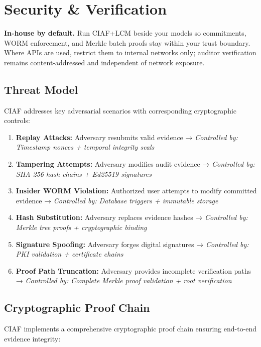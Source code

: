 \documentclass[12pt,a4paper]{article}
\begin{document}
\section{Security \& Verification}

\begin{technicalbox}
\textbf{In-house by default.} Run CIAF+LCM beside your models so commitments, WORM enforcement, and Merkle batch proofs stay within your trust boundary. Where APIs are used, restrict them to internal networks only; auditor verification remains content-addressed and independent of network exposure.
\end{technicalbox}

\subsection{Threat Model}

CIAF addresses key adversarial scenarios with corresponding cryptographic controls:

\begin{enumerate}
\item \textbf{Replay Attacks:} Adversary resubmits valid evidence → \textit{Controlled by: Timestamp nonces + temporal integrity seals}
\item \textbf{Tampering Attempts:} Adversary modifies audit evidence → \textit{Controlled by: SHA-256 hash chains + Ed25519 signatures}
\item \textbf{Insider WORM Violation:} Authorized user attempts to modify committed evidence → \textit{Controlled by: Database triggers + immutable storage}
\item \textbf{Hash Substitution:} Adversary replaces evidence hashes → \textit{Controlled by: Merkle tree proofs + cryptographic binding}
\item \textbf{Signature Spoofing:} Adversary forges digital signatures → \textit{Controlled by: PKI validation + certificate chains}
\item \textbf{Proof Path Truncation:} Adversary provides incomplete verification paths → \textit{Controlled by: Complete Merkle proof validation + root verification}
\end{enumerate}

\subsection{Cryptographic Proof Chain}

CIAF implements a comprehensive cryptographic proof chain ensuring end-to-end evidence integrity:
\end{document}
